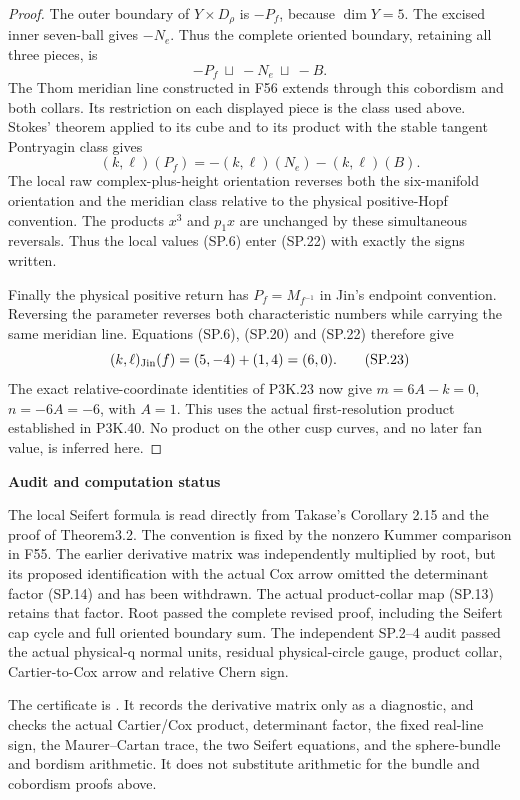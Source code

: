 \begin{proof}
The outer boundary of \(Y\times D_\rho\) is \(-P_f\), because
\(\dim Y=5\). The excised inner seven-ball gives \(-N_e\).
Thus the complete oriented boundary, retaining all three pieces, is
\[
                         -P_f\ \sqcup\ -N_e\ \sqcup\ -B.
                                                               \tag{SP.21}
\]
The Thom meridian line constructed in F56 extends through this
cobordism and both collars. Its restriction on each displayed piece
is the class used above. Stokes' theorem applied to its cube and
to its product with the stable tangent Pontryagin class gives
\[
                  (k,\ell)(P_f)=-(k,\ell)(N_e)-(k,\ell)(B).
                                                               \tag{SP.22}
\]
The local raw complex-plus-height orientation reverses both the
six-manifold orientation and the meridian class relative to the
physical positive-Hopf convention. The products \(x^3\) and
\(p_1x\) are unchanged by these simultaneous reversals. Thus the
local values (SP.6) enter (SP.22) with exactly the signs written.

Finally the physical positive return has
\(P_f=M_{f^{-1}}\) in Jin's endpoint convention. Reversing the
parameter reverses both characteristic numbers while carrying the
same meridian line. Equations (SP.6), (SP.20) and (SP.22) therefore
give
\[
                 (k,\ell)_{\rm Jin}(f)
                       =(5,-4)+(1,4)=(6,0).
                                                               \tag{SP.23}
\]
The exact relative-coordinate identities of P3K.23 now give
\(m=6A-k=0\), \(n=-6A=-6\), with \(A=1\). This uses the
actual first-resolution product established in P3K.40. No product
on the other cusp curves, and no later fan value, is inferred here.
\end{proof}
\par

\medskip\noindent\textbf{Audit and computation status}

\par\nobreak

The local Seifert formula is read directly from Takase's Corollary
2.15 and the proof of Theorem3.2. The convention is fixed by the
nonzero Kummer comparison in F55. The earlier derivative matrix was
independently multiplied by root, but its proposed identification
with the actual Cox arrow omitted the determinant factor (SP.14)
and has been withdrawn. The actual product-collar map (SP.13)
retains that factor. Root passed the complete revised proof,
including the Seifert cap cycle and full oriented boundary sum.
The independent SP.2--4 audit passed the actual physical-q normal
units, residual physical-circle gauge, product collar, Cartier-to-Cox
arrow and relative Chern sign.

The certificate is .
It records the derivative matrix only as a diagnostic, and checks
the actual Cartier/Cox product, determinant factor,
the fixed real-line sign, the Maurer--Cartan trace, the two Seifert
equations, and the sphere-bundle and bordism arithmetic. It does not
substitute arithmetic for the bundle and cobordism proofs above.
